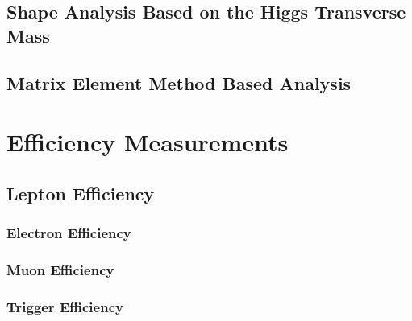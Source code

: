 \documentclass{cmspaper}
\begin{document}

\clearpage
\subsection{Shape Analysis Based on the Higgs Transverse Mass}
\label{sec:anal_mt}

\clearpage

\subsection{Matrix Element Method Based Analysis}
\label{sec:anal_me}


 
%      
%      
%    

\clearpage
\section{Efficiency Measurements}
    \label{sec:alleff}
    \subsection{Lepton Efficiency}
    \label{sec:efficiency}
     
   \subsubsection{Electron Efficiency}
     
       \label{sec:eff_electron}
      \subsubsection{Muon Efficiency}
       
       \label{sec:eff_muon}
        \subsubsection{Trigger Efficiency}
        
        \label{sec:eff_trigger}
%     
\end{document}

